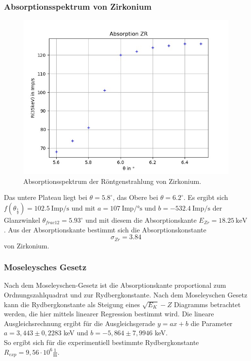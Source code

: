 \subsubsection*{Absorptionsspektrum von Zirkonium}
\begin{figure}[H]
  \centering
  \includegraphics{content/Zr.png}
  \caption{Absorptionsspektrum der Röntgenstrahlung von Zirkonium.}
  \label{fig:zr}
\end{figure}
Das untere Plateau liegt bei $\theta=5.8^\circ$, das Obere bei $\theta=6.2^\circ$. Es ergibt sich $f(\theta_{\frac{1}{2}})=102.5\ \textrm{Imp/s}$ und mit $a=107\ \textrm{Imp/°s}$ und $b=-532.4\ \textrm{Imp/s}$ der Glanzwinkel $\theta_{frac{1}{2}}=5.93^\circ$ und mit diesem die Absorptionskante $E_{Zr}=18.25\ \textrm{keV}$. Aus der Absorptionskante bestimmt sich die Absorptionskonstante
\begin{equation*}
  \sigma_{Zr}=3.84
\end{equation*}
von Zirkonium.




\subsubsection*{Moseleysches Gesetz}
Nach dem Moseleyschen-Gesetz ist die Absorptionskante proportional zum Ordnungszahlquadrat und zur Rydbergkonstante. Nach dem Moseleyschen Gesetz kann die Rydbergkonstante als Steigung eines $\sqrt{E_{K}}-Z$ Diagramms betrachtet werden, die hier mittels linearer Regression bestimmt wird. 
Die lineare Ausgleichsrechnung ergibt für die Ausgleichsgerade $y = ax + b$ die Parameter $a = 3,443 \pm 0,2283$ keV und $b = -5,864 \pm 7,9946$ keV.\\
So ergibt sich für die experimentiell bestimmte Rydbergkonstante $R_{exp} = 9,56 \cdot 10^6 \mathrm{\frac{1}{m}}$. 

